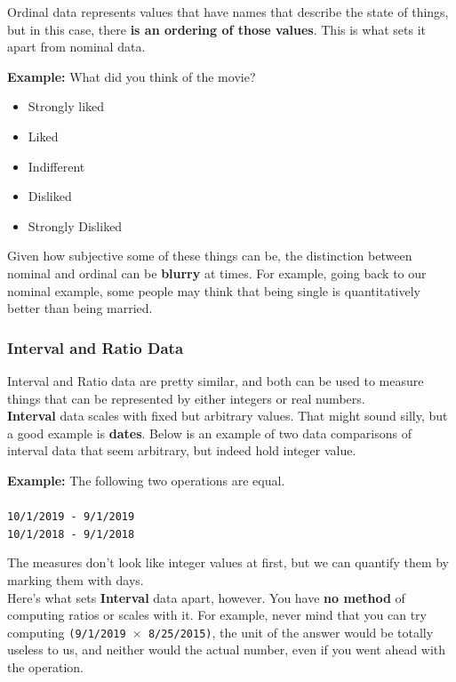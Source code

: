 \documentclass[english, 10pt]{article}
\begin{document}
Ordinal data represents values that have names that describe the state of things, but in this case, there \textbf{is an ordering of those values}. This is what sets it apart from nominal data. \\ 
\begin{myproof}
\textbf{Example:} What did you think of the movie?
\begin{itemize}
	\item Strongly liked
	\item Liked
	\item Indifferent
	\item Disliked
	\item Strongly Disliked
\end{itemize}
\end{myproof}

Given how subjective some of these things can be, the distinction between nominal and ordinal can be \textbf{blurry} at times. For example, going back to our nominal example, some people may think that being single is quantitatively better than being married.

\subsubsection{Interval and Ratio Data}

Interval and Ratio data are pretty similar, and both can be used to measure things that can be represented by either integers or real numbers. \\

\textbf{Interval} data scales with fixed but arbitrary values. That might sound silly, but a good example is \textbf{dates}. Below is an example of two data comparisons of interval data that seem arbitrary, but indeed hold integer value.\\

\begin{myproof}
\textbf{Example:} The following two operations are equal. \\\\
\texttt{10/1/2019 - 9/1/2019} \\
\texttt{10/1/2018 - 9/1/2018}
\end{myproof}

The measures don't look like integer values at first, but we can quantify them by marking them with days.\\

Here's what sets \textbf{Interval} data apart, however. You have \textbf{no method} of computing ratios or scales with it. For example, never mind that you can try computing \texttt{(9/1/2019 $\times$ 8/25/2015)}, the unit of the answer would be totally useless to us, and neither would the actual number, even if you went ahead with the operation.\\
\end{document}
